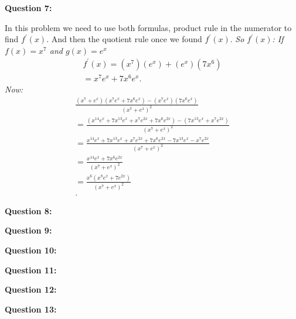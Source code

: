 \documentclass{report}
\begin{document}
    \bigbreak \noindent \bigbreak \noindent 
    \begin{Large}
        \textbf{Question 7:}
    \end{Large}
    \bigbreak \noindent 
    \bigbreak \noindent 
    In this problem we need to use both formulas, product rule in the numerator to find $f ^{\prime}(x)$. 
    And then the quotient rule once we found $f ^{\prime}(x)$.
    \bigbreak \noindent 
    \textit{So $f ^{\prime}(x)$: If $f(x) = x^7$ and $g(x) = e^x$}
    \begin{align*}
        f ^{\prime}(x) = (x^7)(e^x)+(e^x)(7x^6) \\ 
        = x^7e^x+7x^6e^x
    .\end{align*}
    \bigbreak \noindent 
    \textit{Now:} 
    \begin{align*}
        \frac{(x^7+e^x)(x^7e^x+7x^6e^x) - (x^7e^x)(7x^6e^x)}{(x^7+e^x)^2} \\ 
        = \frac{(x^{14}e^x+7x^{13}e^x+x^7e^{2x}+7x^6e^{2x}) - (7x^{13}e^x+x^7e^{2x})}{(x^7+e^x)^2} \\
        = \frac{x^{14}e^x+7x^{13}e^x+x^7e^{2x}+7x^6e^{2x} - 7x^{13}e^x-x^7e^{2x}}{(x^7+e^x)^2} \\
        = \frac{x^{14}e^x+7x^6e^{2x}}{(x^7+e^x)^2} \\
        = \frac{x^6(x^8e^x+7e^{2x})}{(x^7+e^x)^2} \\
    .\end{align*}
    
    \bigbreak \noindent \bigbreak \noindent 
    \begin{Large}
        \textbf{Question 8:}
    \end{Large}
    \bigbreak \noindent 
    \bigbreak \noindent 




    \bigbreak \noindent \bigbreak \noindent 
    \begin{Large}
        \textbf{Question 9:}
    \end{Large}
    \bigbreak \noindent 
    \bigbreak \noindent 

    \bigbreak \noindent \bigbreak \noindent 
    \begin{Large}
        \textbf{Question 10:}
    \end{Large}
    \bigbreak \noindent 
    \bigbreak \noindent 
    

    \bigbreak \noindent \bigbreak \noindent 
    \begin{Large}
        \textbf{Question 11:}
    \end{Large}
    \bigbreak \noindent 
    \bigbreak \noindent 

    \bigbreak \noindent \bigbreak \noindent 
    \begin{Large}
        \textbf{Question 12:}
    \end{Large}
    \bigbreak \noindent 
    \bigbreak \noindent 

    \bigbreak \noindent \bigbreak \noindent 
    \begin{Large}
        \textbf{Question 13:}
    \end{Large}
    \bigbreak \noindent 
    \bigbreak \noindent 
    
\end{document}

